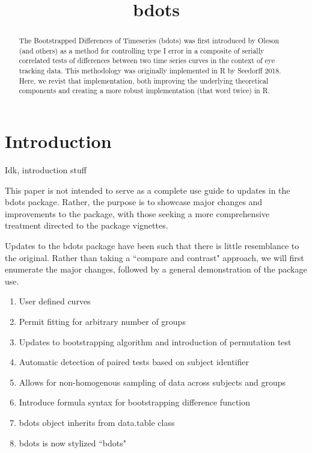 \documentclass{article}
\title{bdots}
\date{}
\begin{document}

\maketitle

%

\begin{abstract}
The Bootstrapped Differences of Timeseries (bdots) was first introduced by Oleson (and others) as a method for controlling type I error in a composite of serially correlated tests of differences between two time series curves in the context of eye tracking data.  This methodology was originally implemented in R by Seedorff 2018. Here, we revist that implementation, both improving the underlying theoretical components and creating a more robust implementation (that word twice) in R. 
\end{abstract}

\section{Introduction}

Idk, introduction stuff

This paper is not intended to serve as a complete use guide to updates in the bdots package. Rather, the purpose is to showcase major changes and improvements to the package, with those seeking a more comprehensive treatment directed to the package vignettes. 

Updates to the bdots package have been such that there is little resemblance to the original. Rather than taking a ``compare and contrast" approach, we will first enumerate the major changes, followed by a general demonstration of the package use. 

\begin{enumerate}
\item User defined curves
\item Permit fitting for arbitrary number of groups
\item Updates to bootstrapping algorithm and introduction of permutation test
\item Automatic detection of paired tests based on subject identifier
\item Allows for non-homogenous sampling of data across subjects and groups
\item Introduce formula syntax for bootstrapping difference function
\item bdots object inherits from data.table class
\item bdots is now stylized ``bdots"
\end{enumerate}
\end{document}
